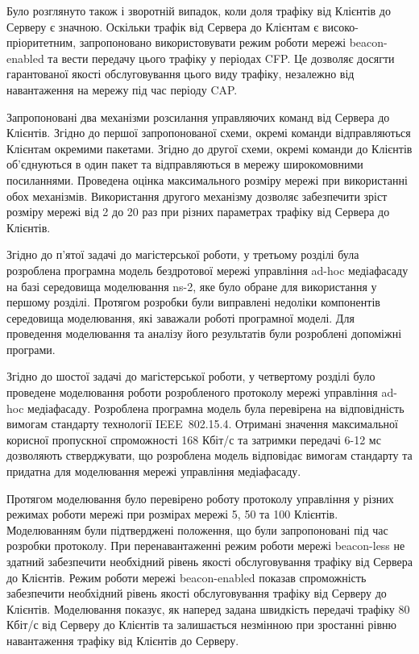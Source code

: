 \documentclass[a4paper,ukrainian,utf8,nocolumnsxix,floatsection,equationsection]{eskdtext}
\newcommand{\iee}[0]{IEEE~802.15.4\xspace}
\newcommand{\blm}[0]{beacon-less\xspace}
\newcommand{\bem}[0]{beacon-enabled\xspace}
\begin{document}
Було розглянуто також і зворотній випадок, коли доля трафіку від Клієнтів до Серверу є значною. Оскільки трафік від Сервера до Клієнтам є високо-пріоритетним, запропоновано використовувати режим роботи мережі \bem та вести передачу цього трафіку у періодах CFP. Це дозволяє досягти гарантованої якості обслуговування цього виду трафіку, незалежно від навантаження на мережу під час періоду CAP.

Запропоновані два механізми розсилання управляючих команд від Сервера до Клієнтів. Згідно до першої запропонованої схеми, окремі команди відправляються Клієнтам окремими пакетами. Згідно до другої схеми, окремі команди до Клієнтів об’єднуються в один пакет та відправляються в мережу широкомовними посиланнями. Проведена оцінка максимального розміру мережі при використанні обох механізмів. Використання другого механізму дозволяє забезпечити зріст розміру мережі від 2 до 20 раз при різних параметрах трафіку від Сервера до Клієнтів.

Згідно до п’ятої задачі до магістерської роботи, у третьому розділі була розроблена програмна модель бездротової мережі управління ad-hoc медіафасаду на базі середовища моделювання ns-2, яке було обране для використання у першому розділі. Протягом розробки були виправлені недоліки компонентів середовища моделювання, які заважали роботі програмної моделі. Для проведення моделювання та аналізу його результатів були розроблені допоміжні програми. 

Згідно до шостої задачі до магістерської роботи, у четвертому розділі було проведене моделювання роботи розробленого протоколу мережі управління ad-hoc медіафасаду. Розроблена програмна модель була перевірена на відповідність вимогам стандарту технології \iee. Отримані значення максимальної корисної пропускної спроможності 168 Кбіт/с та затримки передачі 6-12 мс дозволяють стверджувати, що розроблена модель відповідає вимогам стандарту та придатна для моделювання мережі управління медіафасаду. 

Протягом моделювання було перевірено роботу протоколу управління у різних режимах роботи мережі при розмірах мережі 5, 50 та 100 Клієнтів. Моделюванням були підтверджені положення, що були запропоновані під час розробки протоколу. При перенавантаженні режим роботи мережі \blm не здатний забезпечити необхідний рівень якості обслуговування трафіку від Сервера до Клієнтів. Режим роботи мережі \bem показав спроможність забезпечити необхідний рівень якості обслуговування трафіку від Серверу до Клієнтів. Моделювання показує, як наперед задана швидкість передачі трафіку 80 Кбіт/с від Серверу до Клієнтів та залишається незмінною при зростанні рівню навантаження трафіку від Клієнтів до Серверу.
\end{document}
